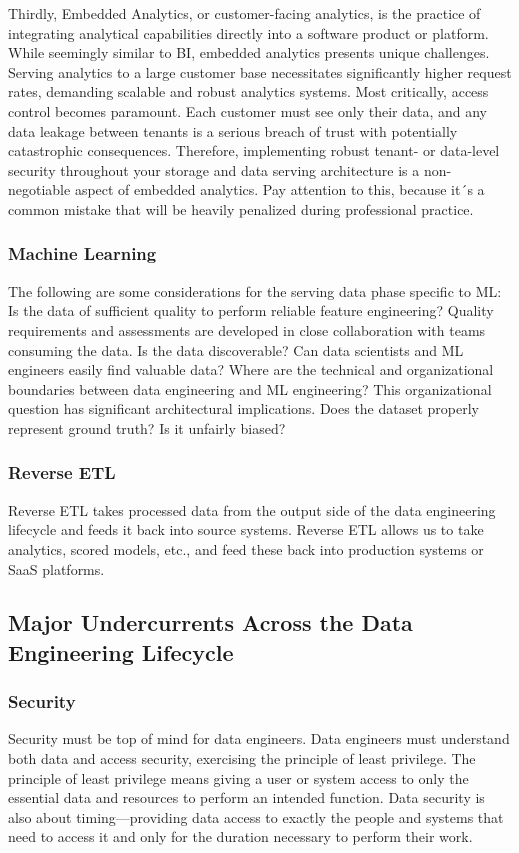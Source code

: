\documentclass[12pt]{book}
\begin{document}
Thirdly, Embedded Analytics, or customer-facing analytics, is the practice of integrating analytical capabilities directly into a software product or platform. While seemingly similar to BI, embedded analytics presents unique challenges. Serving analytics to a large customer base necessitates significantly higher request rates, demanding scalable and robust analytics systems. Most critically, access control becomes paramount. Each customer must see only their data, and any data leakage between tenants is a serious breach of trust with potentially catastrophic consequences. Therefore, implementing robust tenant- or data-level security throughout your storage and data serving architecture is a non-negotiable aspect of embedded analytics. Pay attention to this, because it´s a common mistake that will be heavily penalized during professional practice.

\subsubsection{Machine Learning}


The following are some considerations for the serving data phase specific to
ML:
Is the data of sufficient quality to perform reliable feature engineering?
Quality requirements and assessments are developed in close
collaboration with teams consuming the data.
Is the data discoverable? Can data scientists and ML engineers easily
find valuable data?
Where are the technical and organizational boundaries between data
engineering and ML engineering? This organizational question has
significant architectural implications.
Does the dataset properly represent ground truth? Is it unfairly biased?

\subsubsection{Reverse ETL}
Reverse ETL takes processed data from the output side of the data engineering lifecycle and feeds it back into source systems. Reverse ETL allows us to take analytics, scored models, etc., and feed these back into production systems or SaaS platforms.


\subsection{Major Undercurrents Across the Data Engineering Lifecycle}

\subsubsection{Security}
Security must be top of mind for data engineers. Data engineers must understand both data and access security, exercising the principle of least privilege. The principle of least privilege means giving a user or system access to only the essential data and resources to perform an intended function.
Data security is also about timing—providing data access to exactly the people and systems that need to access it and only for the duration necessary to perform their work.
\end{document}
